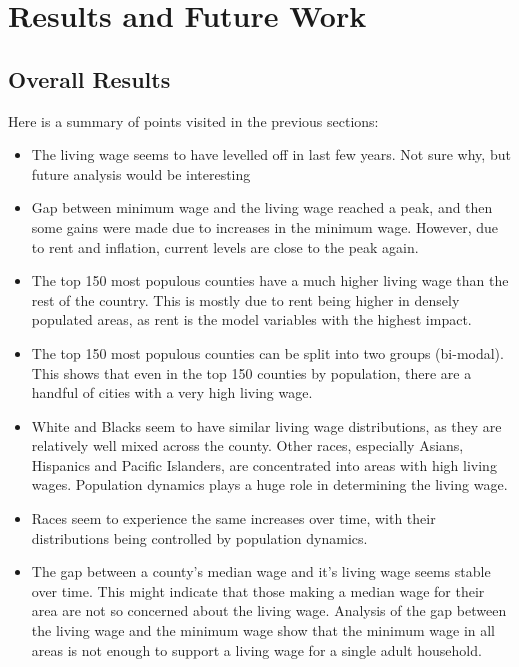 \chapter{Results and Future Work}\label{ch:results}

\section{Overall Results}

Here is a summary of points visited in the previous sections:

\begin{itemize}
\item The living wage seems to have levelled off in last few years. Not sure why, but future analysis would be interesting

\item Gap between minimum wage and the living wage reached a peak, and then some gains were made due to increases in the minimum wage. However, due to rent and inflation, current levels are close to the peak again.

\item The top 150 most populous counties have a much higher living wage than the rest of the country. This is mostly due to rent being higher in densely populated areas, as rent is the model variables with the highest impact.

\item The top 150 most populous counties can be split into two groups (bi-modal). This shows that even in the top 150 counties by population, there are a handful of cities with a very high living wage. 

\item White and Blacks seem to have similar living wage distributions, as they are relatively well mixed across the county. Other races, especially Asians, Hispanics and Pacific Islanders, are concentrated into areas with high living wages. Population dynamics plays a huge role in determining the living wage.

\item Races seem to experience the same increases over time, with their distributions being controlled by population dynamics.

\item The gap between a county's median wage and it's living wage seems stable over time. This might indicate that those making a median wage for their area are not so concerned about the living wage. Analysis of the gap between the living wage and the minimum wage show that the minimum wage in all areas is not enough to support a living wage for a single adult household.


\end{itemize}
